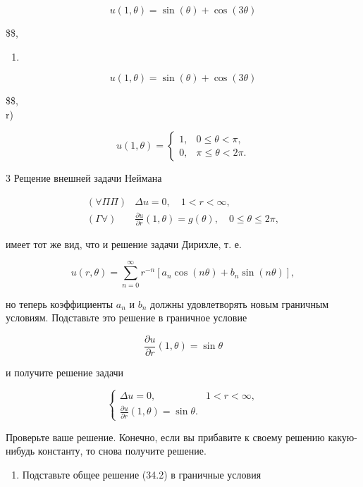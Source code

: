 \documentclass[
  ukrainian,
]{article}
\providecommand{\tightlist}{%
  \setlength{\itemsep}{0pt}\setlength{\parskip}{0pt}}
\begin{document}
\[
u(1, \theta) = \sin(\theta) + \cos(3\theta)
\]

\$\$,

\begin{enumerate}
\def\labelenumi{\Alph{enumi})}
\setcounter{enumi}{1}
\tightlist
\item
\end{enumerate}

\[
u(1, \theta) = \sin(\theta) + \cos(3\theta)
\]

\$\$,\\
r)

\[
u(1, \theta) =\begin{cases} 1, & 0 \le \theta < \pi, \\ 0, & \pi \le \theta < 2\pi. \end{cases}
\]

3 Рещение внешней задачи Неймана

\[
\begin{array}{ll} (\forall \Pi \Pi) & \Delta u = 0, \quad 1 < r < \infty, \\ (\Gamma \forall) & \frac{\partial u}{\partial r} (1, \theta) = g(\theta), \quad 0 \leqslant \theta \leqslant 2\pi, \end{array}
\]

имеет тот же вид, что и решение задачи Дирихле, т. е.

\[
u(r, \theta) = \sum_{n=0}^{\infty} r^{-n} [a_n \cos(n\theta) + b_n \sin(n\theta)],
\]

но теперь коэффициенты \(a_n\) и \(b_n\) должны удовлетворять новым
граничным условиям. Подставьте это решение в граничное условие

\[
\frac{\partial u}{\partial r}(1, \theta) = \sin \theta
\]

и получите решение задачи

\[
\begin{cases} \Delta u = 0, & 1 < r < \infty, \\ \frac{\partial u}{\partial r}(1, \theta) = \sin \theta. \end{cases}
\]

Проверьте ваше решение. Конечно, если вы прибавите к своему решению
какую-нибудь константу, то снова получите решение.

\begin{enumerate}
\def\labelenumi{\arabic{enumi}.}
\setcounter{enumi}{3}
\tightlist
\item
  Подставьте общее решение (34.2) в граничные условия
\end{enumerate}
\end{document}

